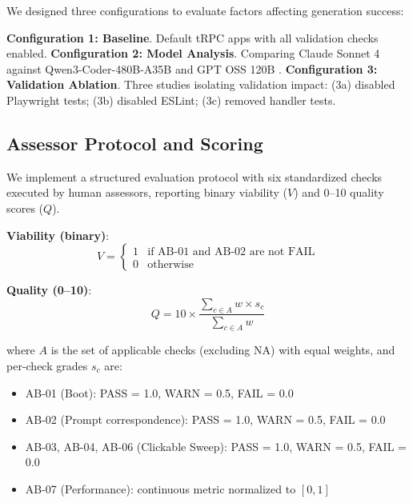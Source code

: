\documentclass{article}
\begin{document}
We designed three configurations to evaluate factors affecting generation success:

\textbf{Configuration 1: Baseline}. Default tRPC apps with all validation checks enabled.
\textbf{Configuration 2: Model Analysis}. Comparing Claude Sonnet 4 against Qwen3-Coder-480B-A35B \citep{qwen2025qwen3} and GPT OSS 120B \citep{openai2025gpt}.
\textbf{Configuration 3: Validation Ablation}. Three studies isolating validation impact: (3a) disabled Playwright tests; (3b) disabled ESLint; (3c) removed handler tests.

\subsection{Assessor Protocol and Scoring}
\label{sec:scoring}

We implement a structured evaluation protocol with six standardized checks executed by human assessors, reporting binary viability ($V$) and 0--10 quality scores ($Q$).

\textbf{Viability (binary)}:
\begin{equation}
V = \begin{cases}
1 & \text{if AB-01 and AB-02 are not FAIL} \\
0 & \text{otherwise}
\end{cases}
\end{equation}

\textbf{Quality (0--10)}:
\begin{equation}
Q = 10 \times \frac{\sum_{c \in A} w \times s_c}{\sum_{c \in A} w}
\end{equation}

where $A$ is the set of applicable checks (excluding NA) with equal weights, and per-check grades $s_c$ are:
\begin{itemize}
\item AB-01 (Boot): PASS = 1.0, WARN = 0.5, FAIL = 0.0
\item AB-02 (Prompt correspondence): PASS = 1.0, WARN = 0.5, FAIL = 0.0
\item AB-03, AB-04, AB-06 (Clickable Sweep): PASS = 1.0, WARN = 0.5, FAIL = 0.0
\item AB-07 (Performance): continuous metric normalized to $[0,1]$
\end{itemize}
\end{document}

